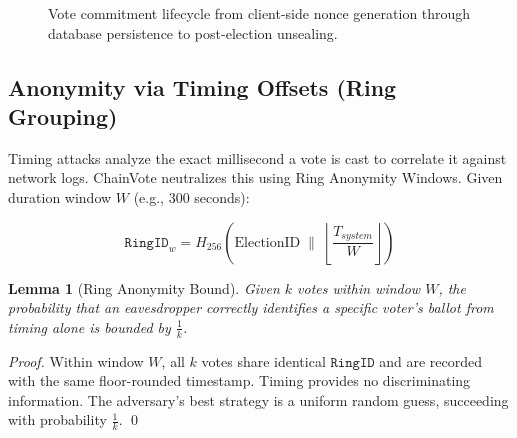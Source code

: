\documentclass[journal,10pt,twocolumn]{IEEEtran}
\newtheorem{lemma}{Lemma}
\begin{document}
\begin{figure}[htbp]
\centering
{}
\caption{Vote commitment lifecycle from client-side nonce generation through database persistence to post-election unsealing.}
\label{fig:commitment_flow}
\end{figure}

\subsection{Anonymity via Timing Offsets (Ring Grouping)}

Timing attacks analyze the exact millisecond a vote is cast to correlate it against network logs. ChainVote neutralizes this using Ring Anonymity Windows. Given duration window $W$ (e.g., 300 seconds):

\begin{equation}
    \mathtt{RingID}_{w} = H_{256}\!\left( \mathrm{ElectionID} \;\|\; \left\lfloor \frac{T_{system}}{W} \right\rfloor \right)
\end{equation}

\begin{lemma}[Ring Anonymity Bound]
Given $k$ votes within window $W$, the probability that an eavesdropper correctly identifies a specific voter's ballot from timing alone is bounded by $\frac{1}{k}$.
\end{lemma}

\begin{proof}
Within window $W$, all $k$ votes share identical $\mathtt{RingID}$ and are recorded with the same floor-rounded timestamp. Timing provides no discriminating information. The adversary's best strategy is a uniform random guess, succeeding with probability $\frac{1}{k}$. \qed
\end{proof}
\end{document}
